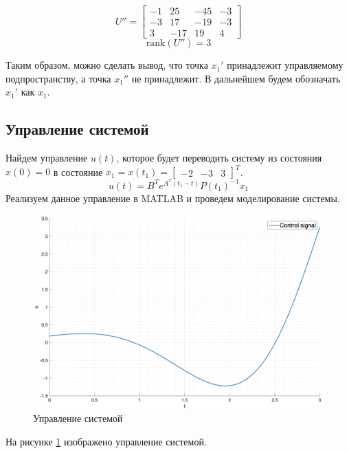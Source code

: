 \begin{equation}
   U'' = \begin{bmatrix}
        -1 & 25 & -45 & -3 \\
        -3 & 17 & -19 & -3 \\
        3 & -17 & 19 & 4
    \end{bmatrix}
\end{equation}
\begin{equation}
    \text{rank}(U'') = 3
\end{equation}

Таким образом, можно сделать вывод, что точка $x_1'$ принадлежит управляемому подпространству, а точка $x_1''$ не принадлежит. В дальнейшем будем обозначать $x_1'$ как $x_1$.

\subsection{Управление системой}
Найдем управление $u(t)$, которое будет переводить систему из состояния $x(0) = 0$ в состояние $x_1 = x(t_1) = \begin{bmatrix} -2 & -3 & 3 \end{bmatrix}^T$. 
\begin{equation}
    u(t) = B^Te^{A^T(t_1 - t)}P(t_1)^{-1}x_1
\end{equation}
Реализуем данное управление в MATLAB и проведем моделирование системы.  
\begin{figure}
    \centering
    \includegraphics[width=\textwidth]{media/plots/task2_control_signal.png}
    \caption{Управление системой}
    \label{fig:task2_control_signal}
\end{figure}
На рисунке \ref{fig:task2_control_signal} изображено управление системой.
